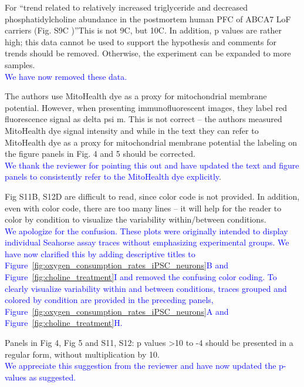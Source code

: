 \documentclass[12pt]{article}
\begin{document}
For “trend related to relatively increased triglyceride and decreased phosphatidylcholine abundance in the postmortem human PFC of ABCA7 LoF carriers (Fig. S9C )”This is not 9C, but 10C. In addition, p values are rather high; this data cannot be used to support the hypothesis and comments for trends should be removed. Otherwise, the experiment can be expanded to more samples.\\
\textcolor{blue}{We have now removed these data.}

The authors use MitoHealth dye as a proxy for mitochondrial membrane potential. However, when presenting immunofluorescent images, they label red fluorescence signal as delta psi m. This is not correct – the authors measured MitoHealth dye signal intensity and while in the text they can refer to MitoHealth dye as a proxy for mitochondrial membrane potential the labeling on the figure panels in Fig. 4 and 5 should be corrected.\\
\textcolor{blue}{We thank the reviewer for pointing this out and have updated the text and figure panels to consistently refer to the MitoHealth dye explicitly}.

Fig S11B, S12D are difficult to read, since color code is not provided. In addition, even with color code, there are too many lines – it will help for the reader to color by condition to visualize the variability within/between conditions.\\
\textcolor{blue}{We apologize for the confusion. These plots were originally intended to display individual Seahorse assay traces without emphasizing experimental groups. We have now clarified this by adding descriptive titles to Figure~\ref{fig:oxygen_consumption_rates_iPSC_neurons}B and Figure~\ref{fig:choline_treatment}I and removed the confusing color coding. To clearly visualize variability within and between conditions, traces grouped and colored by condition are provided in the preceding panels, Figure~\ref{fig:oxygen_consumption_rates_iPSC_neurons}A and Figure~\ref{fig:choline_treatment}H.}

Panels in Fig 4, Fig 5 and S11, S12: p values >10 to -4 should be presented in a regular form, without multiplication by 10.\\
\textcolor{blue}{We appreciate this suggestion from the reviewer and have now updated the p-values as suggested.}
 
\end{document}
